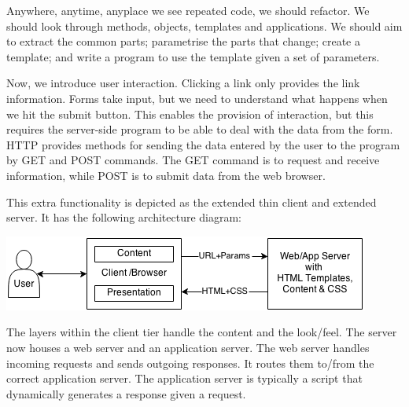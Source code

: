 \documentclass[a4paper, openany]{memoir}
\begin{document}
\noindent Anywhere, anytime, anyplace we see repeated code, we should refactor. We should look through methods, objects, templates and applications. We should aim to extract the common parts; parametrise the parts that change; create a template; and write a program to use the template given a set of parameters.

\noindent Now, we introduce user interaction. Clicking a link only provides the link information. Forms take input, but we need to understand what happens when we hit the submit button. This enables the provision of interaction, but this requires the server-side program to be able to deal with the data from the form. HTTP provides methods for sending the data entered by the user to the program by GET and POST commands. The GET command is to request and receive information, while POST is to submit data from the web browser.

\noindent This extra functionality is depicted as the extended thin client and extended server. It has the following architecture diagram:
\begin{center}
    \includegraphics[scale=0.8]{src/L7I5.png}
\end{center}
The layers within the client tier handle the content and the look/feel. The server now houses a web server and an application server. The web server handles incoming requests and sends outgoing responses. It routes them to/from the correct application server. The application server is typically a script that dynamically generates a response given a request.
\end{document}
